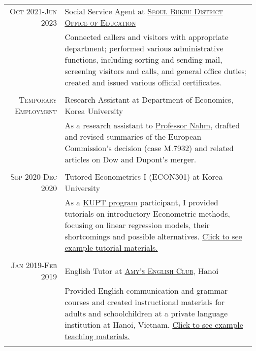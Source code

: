 \documentclass[a4paper,10pt]{article} %
\begin{document}
\begin{tabular}{r|p{11cm}}
    \textsc{Oct 2021-Jun 2023} & Social Service Agent at \href{http://bbedu.sen.go.kr}{\textsc{Seoul Bukbu
    District Office of Education}} \emph{}\\
    & \footnotesize{Connected callers and visitors with appropriate department;
        performed various administrative functions, including sorting and sending
        mail, screening visitors and calls, and general office duties; created and
        issued various official certificates.}\\
    \multicolumn{2}{c}{} \\

    \textsc{Temporary Employment} & Research Assistant at Department of Economics, Korea University\\
    & \footnotesize{As a research assistant to
        \href{http://econ.korea.ac.kr/econ/?dt_team=%EB%82%A8%EC%9E%AC%ED%98%84-jae-nahm}{Professor
        Nahm}, drafted and revised summaries of the European Commission's decision (case M.7932) and related
        articles on Dow and Dupont's merger.}\\
    \multicolumn{2}{c}{} \\

    \textsc{Sep 2020-Dec 2020} & Tutored Econometrics I (ECON301) at Korea
    University \\
    & \footnotesize{As a
        \href{https://ctl.korea.ac.kr/front/content/view.do?content_seq=14}{KUPT
        program} participant,
        I provided tutorials on introductory Econometric methods, focusing on linear
        regression models, their shortcomings and possible alternatives.
        \href{https://drive.google.com/file/d/1CJsRSpE2bg21PmoyaiDFtcpwFTPXwAAa/view?usp=sharing}{Click
        to see example tutorial materials.}} \\
    \multicolumn{2}{c}{} \\

    \textsc{Jan 2019-Feb 2019} & English Tutor at
    \href{https://www.facebook.com/amy.englishclub}{\textsc{Amy's English Club}}, Hanoi \emph{}\\
    & \footnotesize{Provided English communication
        and grammar courses and created instructional materials for adults and schoolchildren at a private language
        institution at Hanoi, Vietnam.
        \href{https://drive.google.com/file/d/1Wb8tWkcThmKiy-Rv2OMMWRkrg-6ddooL/view?usp=sharing}{Click
        to see example teaching materials.}}\\
    \multicolumn{2}{c}{} \\


\end{tabular}
\end{document}
